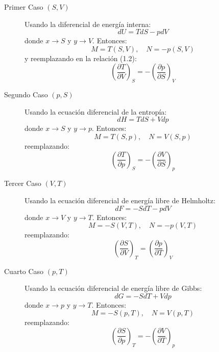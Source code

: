 \begin{description}
\item [Primer Caso $(S, V)$]  
Usando la diferencial de energía interna:
$$dU=TdS-pdV$$
donde $x\rightarrow S$ y $y \rightarrow V$. Entonces:
$$M=T(S,V), \quad N=-p(S,V)$$
y reemplazando en la relación (1.2):
\begin{equation}
    \boxed{
    \left( \frac{\partial  T}{\partial V} \right)_S = -\left( \frac{\partial p}{\partial  S} \right)_V
    }
\end{equation}

\item [Segundo Caso $(p, S)$]  
Usando la ecuación diferencial de la entropía:
$$dH=TdS+Vdp$$
donde $x\rightarrow S$ y $y \rightarrow p$. Entonces:
$$M=T(S,p), \quad N=V(S,p)$$
reemplazando:
\begin{equation}
    \boxed{
    \left( \frac{\partial T}{\partial p} \right)_S = -\left( \frac{\partial V}{\partial  S} \right)_p
    }
\end{equation}

\item [Tercer Caso $(V,T)$]  
Usando la ecuación diferencial de energía libre de Helmholtz:
$$dF=-SdT-pdV$$
donde $x\rightarrow V$ y $y \rightarrow T$. Entonces:
$$M=-S(V,T), \quad N=-p(V,T)$$
reemplazando:
\begin{equation}
    \boxed{
    \left( \frac{\partial  S}{\partial V} \right)_T = \left( \frac{\partial p}{\partial  T} \right)_V
    }
\end{equation}

\item [Cuarto Caso $(p,T)$]  
Usando la ecuación diferencial de energía libre de Gibbs:
$$dG=-SdT+Vdp$$
donde $x\rightarrow p$ y $y \rightarrow T$. Entonces:
$$M=-S(p,T), \quad N=V(p,T)$$
reemplazando:
\begin{equation}
    \boxed{
    \left( \frac{\partial  S}{\partial p} \right)_T = -\left( \frac{\partial V}{\partial  T} \right)_p
    }
\end{equation}
\end{description}

